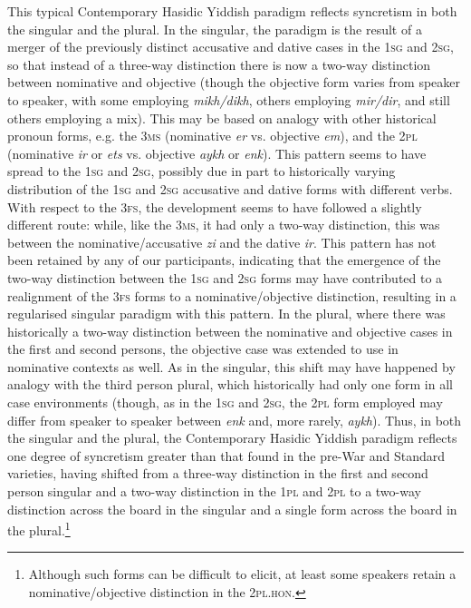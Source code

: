 \documentclass[output=paper, hidelinks]{langscibook}
\begin{document}
This typical Contemporary Hasidic Yiddish paradigm reflects syncretism in both the singular and the plural. In the singular, the paradigm is the result of a merger of the previously distinct accusative and dative cases in the 1\textsc{sg} and 2\textsc{sg}, so that instead of a three-way distinction there is now a two-way distinction between nominative and objective (though the objective form varies from speaker to speaker, with some employing \textit{mikh/dikh}, others employing \textit{mir/dir}, and still others employing a mix). This may be based on analogy with other historical pronoun forms, e.g. the 3\textsc{ms} (nominative \textit{er} vs. objective \textit{em}), and the 2\textsc{pl} (nominative \textit{ir} or \textit{ets} vs. objective \textit{aykh} or \textit{enk}). This pattern seems to have spread to the 1\textsc{sg} and 2\textsc{sg}, possibly due in part to historically varying distribution of the 1\textsc{sg} and 2\textsc{sg} accusative and dative forms with different verbs. With respect to the 3\textsc{fs}, the development seems to have followed a slightly different route: while, like the 3\textsc{ms}, it had only a two-way distinction, this was between the nominative/accusative \textit{zi} and the dative \textit{ir}. This pattern has not been retained by any of our participants, indicating that the emergence of the two-way distinction between the 1\textsc{sg} and 2\textsc{sg} forms may have contributed to a realignment of the 3\textsc{fs} forms to a nominative/objective distinction, resulting in a regularised singular paradigm with this pattern. In the plural, where there was historically a two-way distinction between the nominative and objective cases in the first and second persons, the objective case was extended to use in nominative contexts as well. As in the singular, this shift may have happened by analogy with the third person plural, which historically had only one form in all case environments (though, as in the 1\textsc{sg} and 2\textsc{sg}, the 2\textsc{pl} form employed may differ from speaker to speaker between \textit{enk} and, more rarely, \textit{aykh}). Thus, in both the singular and the plural, the Contemporary Hasidic Yiddish paradigm reflects one degree of syncretism greater than that found in the pre-War and Standard varieties, having shifted from a three-way distinction in the first and second person singular and a two-way distinction in the 1\textsc{pl} and 2\textsc{pl} to a two-way distinction across the board in the singular and a single form across the board in the plural.\footnote{Although such forms can be difficult to elicit, at least some speakers retain a nominative/objective distinction in the 2\textsc{pl.hon}.} 
	
\end{document}

